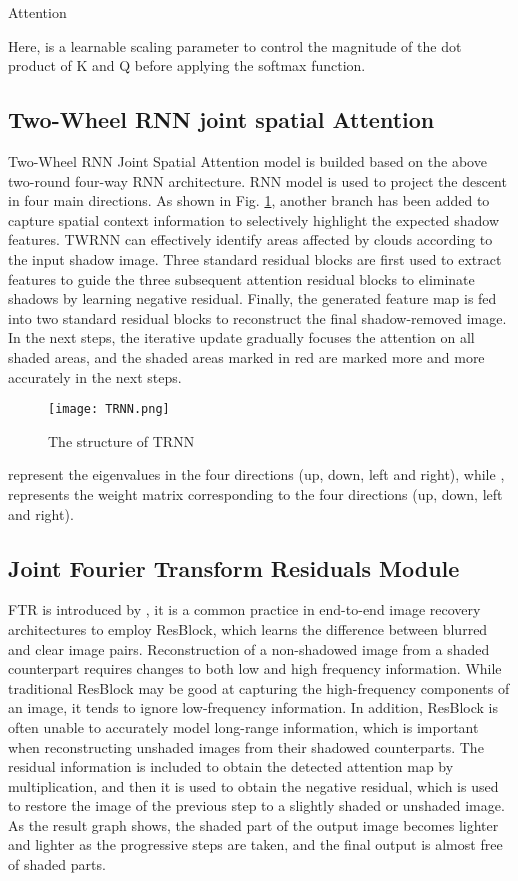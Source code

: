 \documentclass[journal]{IEEEtran}
\begin{document}
 Attention 


Here,  is a learnable scaling parameter to control the magnitude of the dot product of K and Q before applying the softmax function.
\subsection{Two-Wheel RNN joint spatial Attention}
Two-Wheel RNN Joint Spatial Attention model is builded based on the above two-round four-way RNN architecture. RNN model is used to project the descent in four main directions. As shown in Fig. \ref{TRNN}, another branch has been added to capture spatial context information to selectively highlight the expected shadow features. TWRNN can effectively identify areas affected by clouds according to the input shadow image. Three standard residual blocks are first used to extract features to guide the three subsequent attention residual blocks to eliminate shadows by learning negative residual. Finally, the generated feature map is fed into two standard residual blocks to reconstruct the final shadow-removed image. In the next steps, the iterative update gradually focuses the attention on all shaded areas, and the shaded areas marked in red are marked more and more accurately in the next steps.

\begin{figure}
\centering
\texttt{[image: TRNN.png]}
\caption{The structure of TRNN}
\label{TRNN}
\end{figure}

 represent the eigenvalues in the four directions (up, down, left and right), while , represents the weight matrix corresponding to the four directions (up, down, left and right).

\subsection{Joint Fourier Transform Residuals Module}
FTR is introduced by \cite{20}, it is a common practice in end-to-end image recovery architectures to employ ResBlock, which learns the difference between blurred and clear image pairs. Reconstruction of a non-shadowed image from a shaded counterpart requires changes to both low and high frequency information. While traditional ResBlock may be good at capturing the high-frequency components of an image, it tends to ignore low-frequency information. In addition, ResBlock is often unable to accurately model long-range information, which is important when reconstructing unshaded images from their shadowed counterparts. The residual information is included to obtain the detected attention map by multiplication, and then it is used to obtain the negative residual, which is used to restore the image of the previous step to a slightly shaded or unshaded image. As the result graph shows, the shaded part of the output image becomes lighter and lighter as the progressive steps are taken, and the final output is almost free of shaded parts.
\end{document}
